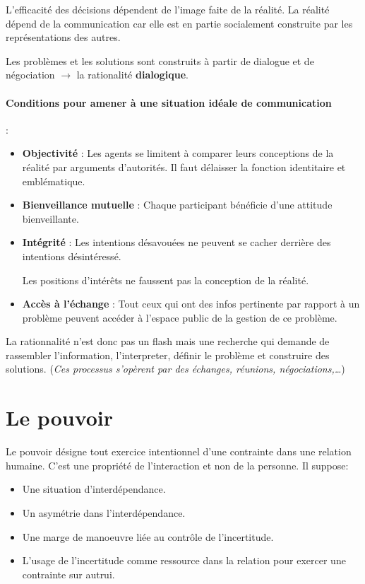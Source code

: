 \documentclass[11pt]{article} %
\begin{document}
L'efficacité des décisions dépendent de l'image faite de la
réalité. La réalité dépend de la communication car elle est
en partie socialement construite par les représentations des autres.

Les problèmes et les solutions sont construits à partir de
dialogue et de négociation $\to$ la rationalité \textbf{dialogique}.

\paragraph{Conditions pour amener à une situation idéale de
communication} :

\begin{itemize}
 \item \textbf{Objectivité} : Les agents se limitent à comparer leurs
 conceptions de la réalité par arguments d'autorités. Il faut
 délaisser la fonction identitaire et emblématique.

 \item \textbf{Bienveillance mutuelle} : Chaque participant bénéficie d'une
attitude bienveillante.

 \item \textbf{Intégrité} : Les intentions désavouées ne peuvent se
 cacher derrière des intentions désintéressé.

 Les positions d'intérêts ne faussent pas la conception de la
 réalité.

 \item \textbf{Accès à l'échange} : Tout ceux qui ont des infos pertinente
 par rapport à un problème peuvent accéder à l'espace public de la
 gestion de ce problème.
\end{itemize}

La rationnalité n'est donc pas un flash mais une recherche qui demande
de rassembler l'information, l'interpreter, définir le problème et
construire des solutions. (\textit{Ces processus s'opèrent par des
échanges, réunions, négociations,\ldots})
	

\section{Le pouvoir}

Le pouvoir désigne tout exercice intentionnel d'une contrainte dans une
relation humaine. C'est une propriété de l'interaction et non de la
personne. Il suppose:

\begin{itemize}
    \item Une situation d'interdépendance.
    \item Un asymétrie dans l'interdépendance.
    \item Une marge de manoeuvre liée au contrôle de l'incertitude.
    \item L'usage de l'incertitude comme ressource dans la relation pour
        exercer une contrainte sur autrui.
\end{itemize}
\end{document}
